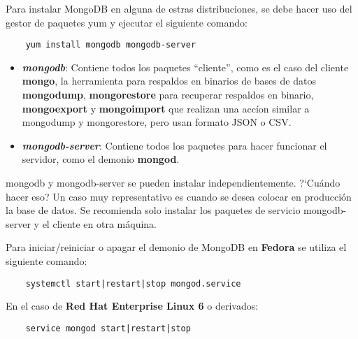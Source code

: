 Para instalar MongoDB en alguna de estras distribuciones, se debe hacer uso del gestor de paquetes yum y ejecutar el siguiente comando:

\begin{lstlisting}
    yum install mongodb mongodb-server
\end{lstlisting}

\begin{itemize}
    \item \textit{\textbf{mongodb}}: Contiene todos los paquetes ``cliente'', como es el caso del cliente \textbf{mongo}, la herramienta para respaldos en binarios de bases de datos \textbf{mongodump}, \textbf{mongorestore} para recuperar respaldos en binario, \textbf{mongoexport} y \textbf{mongoimport} que realizan una acc\'ion similar a mongodump y mongorestore, pero usan formato JSON o CSV.
    \item \textit{\textbf{mongodb-server}}: Contiene todos los paquetes para hacer funcionar el servidor, como el demonio \textbf{mongod}.
\end{itemize}

mongodb y mongodb-server se pueden instalar independientemente. ?`Cu\'ando hacer eso? Un caso muy representativo es cuando se desea colocar en producci\'on la base de datos. Se recomienda solo instalar los paquetes de servicio mongodb-server y el cliente en otra m\'aquina.

Para iniciar/reiniciar o apagar el demonio de MongoDB en \textbf{Fedora} se utiliza el siguiente comando:

\begin{lstlisting}
    systemctl start|restart|stop mongod.service
\end{lstlisting}

En el caso de \textbf{Red Hat Enterprise Linux 6} o derivados:

\begin{lstlisting}
    service mongod start|restart|stop
\end{lstlisting}
